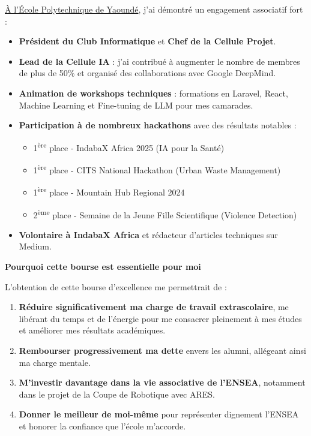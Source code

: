 \documentclass[a4paper,11pt]{article}
\begin{document}
\underline{À l'École Polytechnique de Yaoundé}, j'ai démontré un engagement associatif fort :
\begin{itemize}
    \item \textbf{Président du Club Informatique} et \textbf{Chef de la Cellule Projet}.
    \item \textbf{Lead de la Cellule IA} : j'ai contribué à augmenter le nombre de membres de plus de 50\% et organisé des collaborations avec Google DeepMind.
    \item \textbf{Animation de workshops techniques} : formations en Laravel, React, Machine Learning et Fine-tuning de LLM pour mes camarades.
    \item \textbf{Participation à de nombreux hackathons} avec des résultats notables :
    \begin{itemize}
        \item 1\textsuperscript{ère} place - IndabaX Africa 2025 (IA pour la Santé)
        \item 1\textsuperscript{ère} place - CITS National Hackathon (Urban Waste Management)
        \item 1\textsuperscript{ère} place - Mountain Hub Regional 2024
        \item 2\textsuperscript{ème} place - Semaine de la Jeune Fille Scientifique (Violence Detection)
    \end{itemize}
    \item \textbf{Volontaire à IndabaX Africa} et rédacteur d'articles techniques sur Medium.
\end{itemize}

\vspace{0.4cm}

\textbf{\color{primary}Pourquoi cette bourse est essentielle pour moi}

\vspace{0.2cm}

L'obtention de cette bourse d'excellence me permettrait de :
\begin{enumerate}
    \item \textbf{Réduire significativement ma charge de travail extrascolaire}, me libérant du temps et de l'énergie pour me consacrer pleinement à mes études et améliorer mes résultats académiques.
    \item \textbf{Rembourser progressivement ma dette} envers les alumni, allégeant ainsi ma charge mentale.
    \item \textbf{M'investir davantage dans la vie associative de l'ENSEA}, notamment dans le projet de la Coupe de Robotique avec ARES.
    \item \textbf{Donner le meilleur de moi-même} pour représenter dignement l'ENSEA et honorer la confiance que l'école m'accorde.
\end{enumerate}
\end{document}
